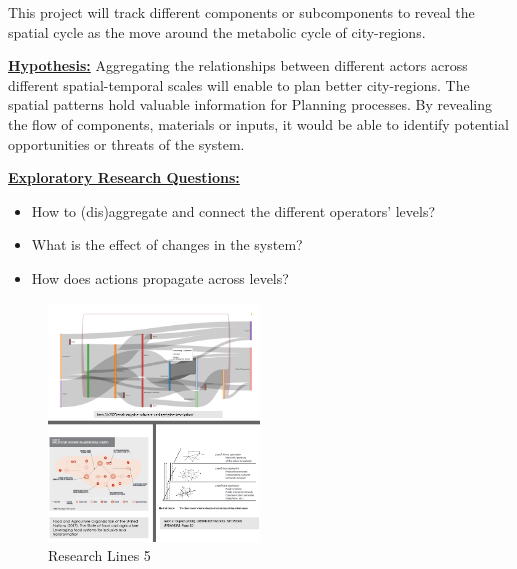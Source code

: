 This project will track different components or subcomponents to reveal the spatial cycle as the move around the metabolic cycle of city-regions. \par



\textbf{\underline {Hypothesis:}} Aggregating the relationships between different actors across different spatial-temporal scales will enable to plan better city-regions. The spatial patterns hold valuable information for Planning processes. By revealing the flow of components, materials or inputs, it would be able to identify potential opportunities or threats of the system. \par


\textbf{\underline {Exploratory Research Questions: }} 
\begin{itemize}
    \item How to (dis)aggregate and connect the different operators’ levels?
    \item What is the effect of changes in the system?
    \item How does actions propagate across levels?
\end{itemize}

\begin{figure}[hbt!]
    \centering
    \includegraphics[width=0.5\textwidth]{Imgs/rl_5.PNG}
    \caption{Research Lines 5}
    \label{fig:rl5}
\end{figure}



